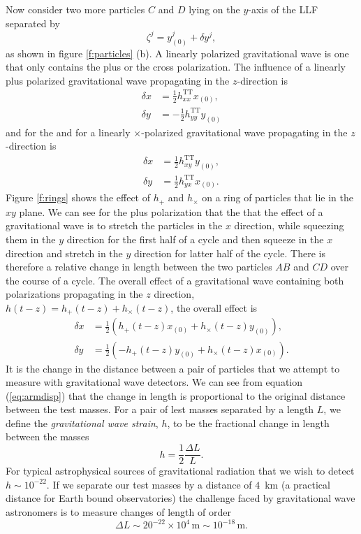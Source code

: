 Now consider two more particles $C$ and $D$ lying on the $y$-axis of the LLF
separated by 
\begin{equation}
\zeta^j = y^j_{(0)} + \delta y^j,
\end{equation}
as shown in figure \ref{f:particles} (b). A linearly polarized gravitational
wave is one that only contains the plus or the cross polarization. The
influence of a linearly plus polarized gravitational wave propagating in the
$z$-direction is
\begin{align}
\delta x &= \frac{1}{2} h_{xx}^\mathrm{TT} x_{(0)},\\
\delta y &= -\frac{1}{2} h_{yy}^\mathrm{TT} y_{(0)}
\end{align}
and for the and for a linearly $\times$-polarized gravitational wave
propagating in the $z$-direction is
\begin{align}
\delta x &= \frac{1}{2} h_{xy}^\mathrm{TT} y_{(0)},\\
\delta y &= \frac{1}{2} h_{yx}^\mathrm{TT} x_{(0)}.
\end{align}
Figure \ref{f:rings} shows the effect of $h_{+}$ and $h_{\times}$ on a ring
of particles that lie in the $xy$ plane. We can see for the plus polarization
that the that the effect of a gravitational wave is to stretch the particles
in the $x$ direction, while squeezing them in the $y$ direction for the first
half of a cycle and then squeeze in the $x$ direction and stretch in the $y$
direction for latter half of the cycle.  There is therefore a relative change
in length between the two particles $AB$ and $CD$ over the course of a cycle.
The overall effect of a gravitational wave containing both polarizations
propagating in the $z$ direction, $h(t-z) = h_{+}(t-z) + h_{\times}(t-z)$, the
overall effect is
\begin{align}
\delta x &= \frac{1}{2}\left(h_{+}(t-z) x_{(0)} + h_{\times}(t-z) y_{(0)}\right),\\
\delta y &= \frac{1}{2}\left(-h_{+}(t-z) y_{(0)} + h_{\times}(t-z) x_{(0)}\right).
\label{eq:armdisp}
\end{align}
It is the change in the distance between a pair of particles that we attempt
to measure with gravitational wave detectors. We can see from equation
(\ref{eq:armdisp}) that the change in length is proportional to the original
distance between the test masses. For a pair of lest masses separated by a
length $L$, we define the \emph{gravitational wave strain}, $h$, to be the
fractional change in length between the masses
\begin{equation}
h = \frac{1}{2} \frac{\Delta L}{L}.
\end{equation}
For typical astrophysical sources of gravitational radiation that we wish to
detect $h \sim 10^{-22}$. If we separate our test masses by a distance of
$4$~km (a practical distance for Earth bound observatories) the challenge
faced by gravitational wave astronomers is to measure changes of length of
order \begin{equation}
\Delta L \sim 20^{-22} \times 10^4\,\mathrm{m} \sim 10^{-18}\,\mathrm{m}.
\end{equation}

